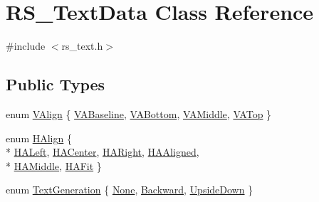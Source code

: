\hypertarget{classRS__TextData}{\section{R\-S\-\_\-\-Text\-Data Class Reference}
\label{classRS__TextData}
}


{\ttfamily \#include $<$rs\-\_\-text.\-h$>$}

\subsection*{Public Types}
\begin{DoxyCompactItemize}
\item 
enum \hyperlink{classRS__TextData_ac2501fdff1871b36025d584099ab51d1}{V\-Align} \{ \hyperlink{classRS__TextData_ac2501fdff1871b36025d584099ab51d1aa44905398c01c9cd06ce005c3448b517}{V\-A\-Baseline}, 
\hyperlink{classRS__TextData_ac2501fdff1871b36025d584099ab51d1ab4d5ad75110dc919a24469ab36dac324}{V\-A\-Bottom}, 
\hyperlink{classRS__TextData_ac2501fdff1871b36025d584099ab51d1ab75b61d05235f198943db352f10582c6}{V\-A\-Middle}, 
\hyperlink{classRS__TextData_ac2501fdff1871b36025d584099ab51d1a74b43c29ee2cf5c11423e641abeadfd1}{V\-A\-Top}
 \}
\item 
enum \hyperlink{classRS__TextData_a70932aa9cb36e3b9cc11dc1029d3146d}{H\-Align} \{ \\*
\hyperlink{classRS__TextData_a70932aa9cb36e3b9cc11dc1029d3146da7faec1e7da1299b90d8ab60ee16edc09}{H\-A\-Left}, 
\hyperlink{classRS__TextData_a70932aa9cb36e3b9cc11dc1029d3146dabaed9a212e38b036dd97fae3dcedb14e}{H\-A\-Center}, 
\hyperlink{classRS__TextData_a70932aa9cb36e3b9cc11dc1029d3146da7407dace4019bcd6262813a630f5724c}{H\-A\-Right}, 
\hyperlink{classRS__TextData_a70932aa9cb36e3b9cc11dc1029d3146dafc37c3152a37c51001f3a4e54d1bbfe0}{H\-A\-Aligned}, 
\\*
\hyperlink{classRS__TextData_a70932aa9cb36e3b9cc11dc1029d3146dab01bbb358c238ff50c51833783f40cbb}{H\-A\-Middle}, 
\hyperlink{classRS__TextData_a70932aa9cb36e3b9cc11dc1029d3146da7d75ae7249e341e531dcad4505fd07fe}{H\-A\-Fit}
 \}
\item 
enum \hyperlink{classRS__TextData_a1abf0a4dfba0000c09a599aa059f5fa0}{Text\-Generation} \{ \hyperlink{classRS__TextData_a1abf0a4dfba0000c09a599aa059f5fa0a547aa8ed5a57b388d8220dcce175b129}{None}, 
\hyperlink{classRS__TextData_a1abf0a4dfba0000c09a599aa059f5fa0a58657554921e7288d440c1640ae90750}{Backward}, 
\hyperlink{classRS__TextData_a1abf0a4dfba0000c09a599aa059f5fa0a88deaf282e86cd0819af9e1a49bad975}{Upside\-Down}
 \}
\end{DoxyCompactItemize}
